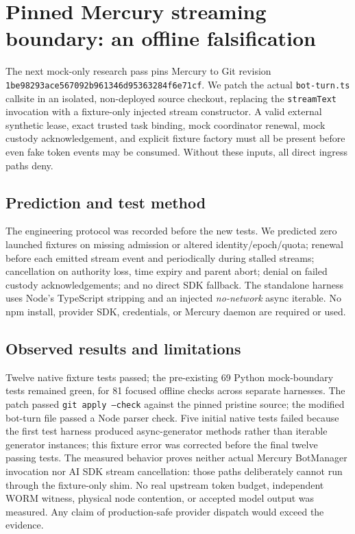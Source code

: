 \documentclass[11pt]{article}
\begin{document}
\section{Pinned Mercury streaming boundary: an offline falsification}
The next mock-only research pass pins Mercury to Git revision
\texttt{1be98293ace567092b961346d95363284f6e71cf}. We patch the actual
\texttt{bot-turn.ts} callsite in an isolated, non-deployed source checkout,
replacing the \texttt{streamText} invocation with a fixture-only injected
stream constructor. A valid external synthetic lease, exact trusted task
binding, mock coordinator renewal, mock custody acknowledgement, and
explicit fixture factory must all be present before even fake token events
may be consumed. Without these inputs, all direct ingress paths deny.

\subsection{Prediction and test method}
The engineering protocol was recorded before the new tests. We predicted
zero launched fixtures on missing admission or altered identity/epoch/quota;
renewal before each emitted stream event and periodically during stalled
streams; cancellation on authority loss, time expiry and parent abort;
denial on failed custody acknowledgements; and no direct SDK fallback.
The standalone harness uses Node's TypeScript stripping and an injected
\emph{no-network} async iterable. No npm install, provider SDK, credentials,
or Mercury daemon are required or used.

\subsection{Observed results and limitations}
Twelve native fixture tests passed; the pre-existing 69 Python mock-boundary
tests remained green, for 81 focused offline checks across separate harnesses.
The patch passed \texttt{git apply --check} against the pinned pristine source;
the modified bot-turn file passed a Node parser check. Five initial native
tests failed because the first test harness produced async-generator methods
rather than iterable generator instances; this fixture error was corrected
before the final twelve passing tests. The measured behavior proves neither
actual Mercury BotManager invocation nor AI SDK stream cancellation:
those paths deliberately cannot run through the fixture-only shim.
No real upstream token budget, independent WORM witness, physical node
contention, or accepted model output was measured. Any claim of
production-safe provider dispatch would exceed the evidence.
\end{document}
